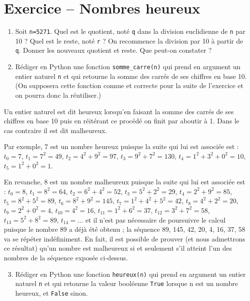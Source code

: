 \section{Exercice -- Nombres heureux}

\begin{enumerate}

\item Soit \verb?n=5271?. Quel est le quotient, noté \verb?q? dans la division euclidienne de \verb?n? par 10 ? Quel est le reste, noté \verb?r? ? On recommence la division par 10 à partir de \verb?q?. Donner les nouveaux quotient et reste. Que peut-on constater ?

\item Rédiger en Python une fonction \verb?somme_carre(n)? qui prend en argument un entier naturel \verb?n? et qui retourne la somme des carrés de ses chiffres en base 10. (On supposera cette fonction connue et correcte pour la suite de l'exercice et on pourra donc la réutiliser.)
\end{enumerate}

Un entier naturel est dit heureux lorsqu’en faisant la somme des carrés de ses chiffres en base 10 puis en réitérant ce procédé on finit par aboutir à 1. Dans le cas contraire il est dit malheureux. 

Par exemple, 7 est un nombre heureux puisque la suite qui lui est associée est : $t_0= 7$, $t_ 1= 7^2= 49$, $t_2= 4^2+ 9^2= 97$, $t_3= 9^2+ 7^2= 130$,    $t_4= 1^2+ 3^2+ 0^2= 10$, $t_5= 1^2+ 0^2= 1$. 

En revanche, 8 est un nombre malheureux puisque la suite qui lui est associée est : $t_0= 8$, $t_1= 8^2= 64$, $t_2= 6^2+ 4^2= 52$, $t_3= 5^2+ 2^2= 29$, $t_4= 2^2+ 9^2= 85$, $t_5= 8^2+ 5^2= 89$, $t_6= 8^2+ 9^2= 145$, $t_7= 1^2+ 4^2+ 5^2= 42$, $t_8= 4^2+ 2^2= 20$, $t_9= 2^2+ 0^2= 4$, $t_{10}= 4^2 = 16$, $t_{11}= 1^2+ 6^2= 37$, $t_{12}= 3^2+ 7^2= 58$, $t_{13}= 5^2+ 8^2= 89$, $t_{14}= \dots$ et il n’est pas nécessaire de poursuivre le calcul puisque le nombre 89 a déjà été obtenu ; la séquence 89, 145, 42, 20, 4, 16, 37, 58 va se répéter indéfiniment. En fait, il est possible de prouver (et nous admettrons ce résultat) qu’un nombre est malheureux si et seulement s’il atteint l’un des nombres de la séquence exposée ci-dessus. 

\begin{enumerate}
\setcounter{enumi}{2}
\item Rédiger en Python une fonction \verb?heureux(n)? qui prend en argument un entier naturel \verb?n? et qui retourne la valeur booléenne \verb?True? lorsque n est un nombre heureux, et \verb?False? sinon.
\end{enumerate}


